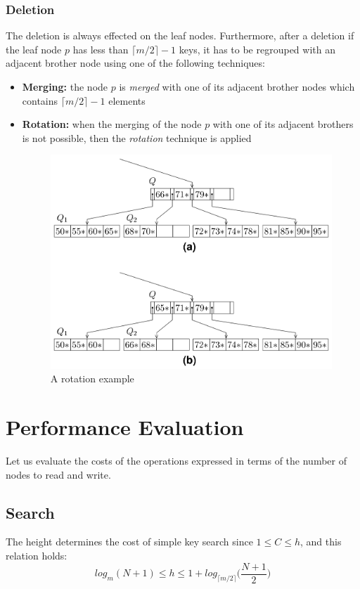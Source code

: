 
\subsubsection{Deletion}
The deletion is always effected on the leaf nodes. Furthermore, after a deletion if the leaf node \(p\) has less than \(\lceil m/2 \rceil - 1\) keys, it has to be regrouped with an adjacent brother node using one of the following techniques:
\begin{itemize}
    \item \textbf{Merging:} the node \(p\) is \textit{merged} with one of its adjacent brother nodes which contains \(\lceil m/2 \rceil - 1\) elements 
    \item \textbf{Rotation:} when the merging of the node \(p\) with one of its adjacent brothers is not possible, then the \textit{rotation} technique is applied
    \begin{figure}[!h]
    \centering
    \includegraphics[width=0.6\linewidth]{images/DBMS_Internals/DynamicTreeStructureOrganizations/rotation_example.jpeg}
    \caption{A rotation example}
\end{figure}
\end{itemize}


\section{Performance Evaluation}
Let us evaluate the costs of the operations expressed in terms of the number of nodes to read and write.

\subsection{Search}
The height determines the cost of simple key search since \(1 \leq C \leq h\), and this relation holds:
\[log_m(N +1) \leq h \leq 1 + log_{\lceil m / 2 \rceil} \Bigg(\frac{N + 1}{2} \Bigg)\]

